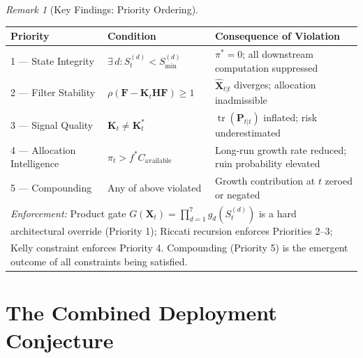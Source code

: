 \documentclass[12pt,openany]{book}
\numberwithin{equation}{chapter}
\theoremstyle{plain}
\theoremstyle{definition}
\theoremstyle{remark}
\newtheorem{remark}[theorem]{Remark}
\DeclareMathOperator{\tr}{tr}
\def\mathcal#1{#1}%
\begin{document}
\begin{remark}[Key Findings: Priority Ordering]
\label{rem:priority-key-findings}
\begin{center}
\begin{tabularx}{\textwidth}{@{} p{3.8cm} X X @{}}
\toprule
\textbf{Priority} & \textbf{Condition} & \textbf{Consequence of Violation} \\
\midrule
1 — State Integrity &
  $\exists\,d:\mathcal{S}_t^{(d)}<\mathcal{S}_{\min}^{(d)}$ &
  $\pi^*=0$; all downstream computation suppressed \\[4pt]
2 — Filter Stability &
  $\rho(\mathbf{F}-\mathbf{K}_t\mathbf{H}\mathbf{F})\geq 1$ &
  $\hat{\mathbf{X}}_{t|t}$ diverges; allocation inadmissible \\[4pt]
3 — Signal Quality &
  $\mathbf{K}_t \neq \mathbf{K}_t^*$ &
  $\tr(\mathbf{P}_{t|t})$ inflated; risk underestimated \\[4pt]
4 — Allocation Intelligence &
  $\pi_t > f^* C_{\mathrm{available}}$ &
  Long-run growth rate reduced; ruin probability elevated \\[4pt]
5 — Compounding &
  Any of above violated &
  Growth contribution at $t$ zeroed or negated \\
\midrule
\multicolumn{3}{p{0.96\textwidth}}{\textit{Enforcement:} Product gate
  $G(\mathbf{X}_t)=\prod_{d=1}^7 g_d(\mathcal{S}_t^{(d)})$ is a
  hard architectural override (Priority 1); Riccati recursion
  enforces Priorities 2--3;} \\
\multicolumn{3}{p{0.96\textwidth}}{Kelly constraint enforces Priority 4.
  Compounding (Priority 5) is the emergent outcome of all
  constraints being satisfied.} \\
\bottomrule
\end{tabularx}
\end{center}
\end{remark}

\section{The Combined Deployment Conjecture}
\end{document}
